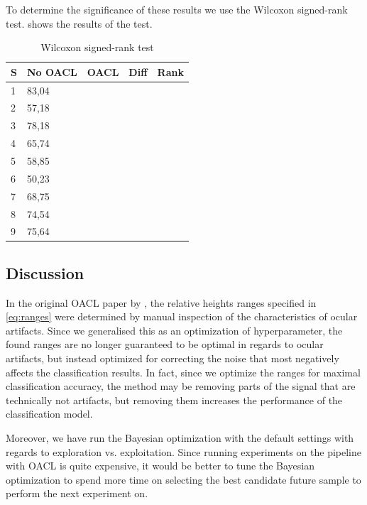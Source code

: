 To determine the significance of these results we use the Wilcoxon signed-rank test.  shows the results of the test.

\begin{table}[H]
	\centering
	\caption{Wilcoxon signed-rank test}
	\label{fig:wilcoxon}
	\begin{tabular}{@{}l|llll@{}}
		\toprule
		S & No OACL & OACL & Diff & Rank \\ \midrule
		1 &   83,04            &                 &      &      \\
		2 &   57,18            &                 &      &      \\
		3 &   78,18            &                 &      &      \\
		4 &   65,74            &                 &      &      \\
		5 &   58,85            &                 &      &      \\
		6 &   50,23            &                 &      &      \\
		7 &   68,75            &                 &      &      \\
		8 &   74,54            &                 &      &      \\
		9 &   75,64            &                 &      &      \\ \bottomrule
	\end{tabular}
\end{table}

\subsection{Discussion}\label{sec:discussion}
In the original OACL paper by \citep{li2015ocular}, the relative heights ranges specified in \cref{eq:ranges} were determined by manual inspection of the characteristics of ocular artifacts. Since we generalised this as an optimization of hyperparameter, the found ranges are no longer guaranteed to be optimal in regards to ocular artifacts, but instead optimized for correcting the noise that most negatively affects the classification results. In fact, since we optimize the ranges for maximal classification accuracy, the method may be removing parts of the signal that are technically not artifacts, but removing them increases the performance of the classification model.

Moreover, we have run the Bayesian optimization with the default settings with regards to exploration vs. exploitation. Since running experiments on the pipeline with OACL is quite expensive, it would be better to tune the Bayesian optimization to spend more time on selecting the best candidate future sample to perform the next experiment on.

